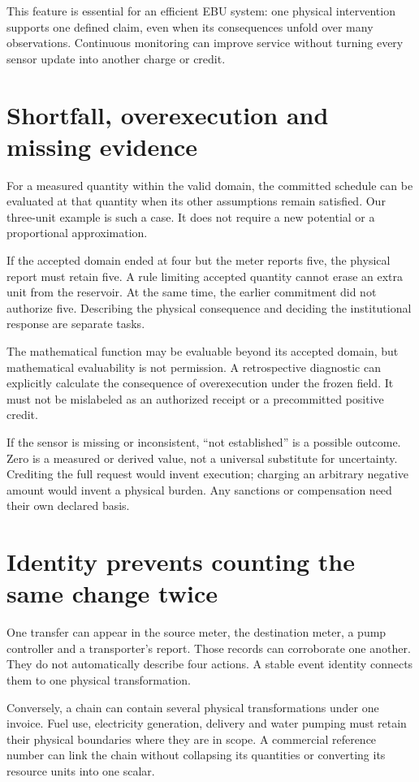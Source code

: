 This feature is essential for an efficient EBU system: one physical intervention supports one defined claim, even when its consequences unfold over many observations. Continuous monitoring can improve service without turning every sensor update into another charge or credit.

\section{Shortfall, overexecution and missing evidence}
For a measured quantity within the valid domain, the committed schedule can be evaluated at that quantity when its other assumptions remain satisfied. Our three-unit example is such a case. It does not require a new potential or a proportional approximation.

If the accepted domain ended at four but the meter reports five, the physical report must retain five. A rule limiting accepted quantity cannot erase an extra unit from the reservoir. At the same time, the earlier commitment did not authorize five. Describing the physical consequence and deciding the institutional response are separate tasks.

The mathematical function may be evaluable beyond its accepted domain, but mathematical evaluability is not permission. A retrospective diagnostic can explicitly calculate the consequence of overexecution under the frozen field. It must not be mislabeled as an authorized receipt or a precommitted positive credit.

If the sensor is missing or inconsistent, ``not established'' is a possible outcome. Zero is a measured or derived value, not a universal substitute for uncertainty. Crediting the full request would invent execution; charging an arbitrary negative amount would invent a physical burden. Any sanctions or compensation need their own declared basis.

\section{Identity prevents counting the same change twice}
One transfer can appear in the source meter, the destination meter, a pump controller and a transporter's report. Those records can corroborate one another. They do not automatically describe four actions. A stable event identity connects them to one physical transformation.

Conversely, a chain can contain several physical transformations under one invoice. Fuel use, electricity generation, delivery and water pumping must retain their physical boundaries where they are in scope. A commercial reference number can link the chain without collapsing its quantities or converting its resource units into one scalar.

